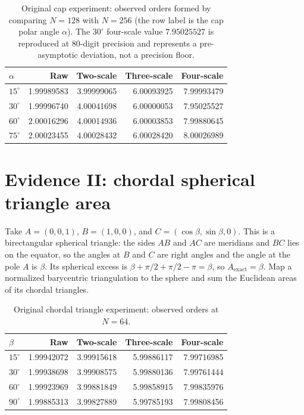 \documentclass[11pt]{article}
\theoremstyle{remark}
\newcommand{\Aex}{A_{\mathrm{exact}}}
\begin{document}
\begin{table}[ht]
\centering
\begin{tabular}{lrrrr}
\toprule
$\alpha$ & Raw & Two-scale & Three-scale & Four-scale\\
\midrule
$15^\circ$ & 1.99989583 & 3.99999065 & 6.00093925 & 7.99993479\\
$30^\circ$ & 1.99996740 & 4.00041698 & 6.00000053 & 7.95025527\\
$60^\circ$ & 2.00016296 & 4.00014936 & 6.00003853 & 7.99880645\\
$75^\circ$ & 2.00023455 & 4.00028432 & 6.00028420 & 8.00026989\\
\bottomrule
\end{tabular}
\caption{Original cap experiment: observed orders formed by comparing $N=128$ with $N=256$ (the row label is the cap polar angle $\alpha$). The $30^\circ$ four-scale value $7.95025527$ is reproduced at 80-digit precision and represents a pre-asymptotic deviation, not a precision floor.}
\end{table}

\section{Evidence II: chordal spherical triangle area}
Take $A=(0,0,1)$, $B=(1,0,0)$, and $C=(\cos\beta,\sin\beta,0)$. This is a birectangular
spherical triangle: the sides $AB$ and $AC$ are meridians and $BC$ lies on the equator, so the
angles at $B$ and $C$ are right angles and the angle at the pole $A$ is $\beta$. Its spherical
excess is $\beta+\pi/2+\pi/2-\pi=\beta$, so $\Aex=\beta$. Map a normalized barycentric
triangulation to the sphere and sum the Euclidean areas of its chordal triangles.

\begin{table}[ht]
\centering
\begin{tabular}{lrrrr}
\toprule
$\beta$ & Raw & Two-scale & Three-scale & Four-scale\\
\midrule
$15^\circ$ & 1.99942072 & 3.99915618 & 5.99886117 & 7.99716985\\
$30^\circ$ & 1.99938698 & 3.99908575 & 5.99880136 & 7.99761444\\
$60^\circ$ & 1.99923969 & 3.99881849 & 5.99858915 & 7.99835976\\
$90^\circ$ & 1.99885313 & 3.99827889 & 5.99785193 & 7.99808456\\
\bottomrule
\end{tabular}
\caption{Original chordal triangle experiment: observed orders at $N=64$.}
\end{table}
\end{document}
